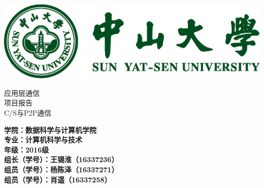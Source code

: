 \begin{titlepage}
    \centering
    \includegraphics[width=1\textwidth]{imgs/SYSULogo.png}\par\vspace{1cm}
    \vspace{1cm}
    {\scshape\huge 应用层通信 \\ 项目报告 \\ \centering \scshape \Huge C/S与P2P通信 \par}
    \vspace{1.5cm}
    {\Large\bfseries \flushleft 学院：数据科学与计算机学院 \\ 专业：计算机科学与技术 \\ 年级：2016级 \\组长（学号）：王锡淮（16337236）\\组员（学号）：杨陈泽（16337271）\\
    组员（学号）：肖遥（16337258）\par}

\end{titlepage}